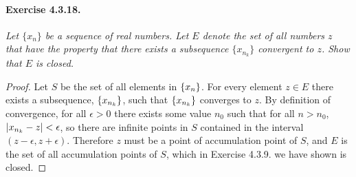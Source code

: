 \documentclass[11pt]{article}
\DeclarePairedDelimiter{\abs}{\lvert}{\rvert}
\begin{document}
\paragraph{Exercise 4.3.18.} \textit{Let $\{x_n\}$ be a sequence of real numbers.
Let $E$ denote the set of all numbers $z$ that have the property that there exists a subsequence $\{x_{n_k}\}$ convergent to $z$. Show that $E$ is closed.} 

\begin{proof}
Let $S$ be the set of all elements in $\{x_n\}$. For every element $z \in E$ there exists a subsequence, $\{x_{n_k}\}$, such that $\{x_{n_k}\}$ converges to $z$. By definition of convergence, for all $\epsilon > 0$ there exists some value $n_0$ such that for all $n > n_0$, $\abs*{\xnk - z} < \epsilon$, so there are infinite points in $S$ contained in the interval $(z - \epsilon, z + \epsilon)$. Therefore $z$ must be a point of accumulation point of $S$, and $E$ is the set of all accumulation points of $S$, which in Exercise 4.3.9. we have shown is closed.
\end{proof}
\end{document}
